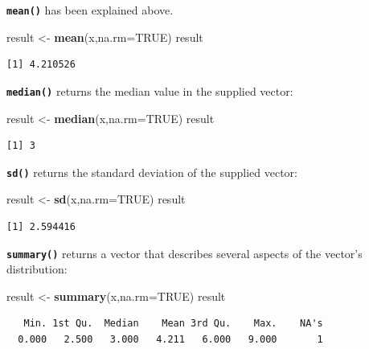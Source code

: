\documentclass[
]{book}
\newenvironment{Shaded}{\begin{snugshade}}{\end{snugshade}}
\newcommand{\DataTypeTok}[1]{\textcolor[rgb]{0.13,0.29,0.53}{#1}}
\newcommand{\KeywordTok}[1]{\textcolor[rgb]{0.13,0.29,0.53}{\textbf{#1}}}
\newcommand{\NormalTok}[1]{#1}
\newcommand{\OtherTok}[1]{\textcolor[rgb]{0.56,0.35,0.01}{#1}}
\newcommand{\StringTok}[1]{\textcolor[rgb]{0.31,0.60,0.02}{#1}}
\begin{document}
\textbf{\texttt{mean()}} has been explained above.

\begin{Shaded}
\begin{Highlighting}[]
\NormalTok{result <-}\StringTok{ }\KeywordTok{mean}\NormalTok{(x,}\DataTypeTok{na.rm=}\OtherTok{TRUE}\NormalTok{)}
\NormalTok{result}
\end{Highlighting}
\end{Shaded}

\begin{verbatim}
[1] 4.210526
\end{verbatim}

\textbf{\texttt{median()}} returns the median value in the supplied vector:

\begin{Shaded}
\begin{Highlighting}[]
\NormalTok{result <-}\StringTok{ }\KeywordTok{median}\NormalTok{(x,}\DataTypeTok{na.rm=}\OtherTok{TRUE}\NormalTok{)}
\NormalTok{result}
\end{Highlighting}
\end{Shaded}

\begin{verbatim}
[1] 3
\end{verbatim}

\textbf{\texttt{sd()}} returns the standard deviation of the supplied vector:

\begin{Shaded}
\begin{Highlighting}[]
\NormalTok{result <-}\StringTok{ }\KeywordTok{sd}\NormalTok{(x,}\DataTypeTok{na.rm=}\OtherTok{TRUE}\NormalTok{)}
\NormalTok{result}
\end{Highlighting}
\end{Shaded}

\begin{verbatim}
[1] 2.594416
\end{verbatim}

\textbf{\texttt{summary()}} returns a vector that describes several aspects of the vector's distribution:

\begin{Shaded}
\begin{Highlighting}[]
\NormalTok{result <-}\StringTok{ }\KeywordTok{summary}\NormalTok{(x,}\DataTypeTok{na.rm=}\OtherTok{TRUE}\NormalTok{)}
\NormalTok{result}
\end{Highlighting}
\end{Shaded}

\begin{verbatim}
   Min. 1st Qu.  Median    Mean 3rd Qu.    Max.    NA's 
  0.000   2.500   3.000   4.211   6.000   9.000       1 
\end{verbatim}
\end{document}
